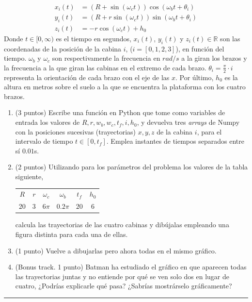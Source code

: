 \begin{enumerate}
	\begin{equation*}
		\begin{split}
			x_i(t) &= \left(R+\sin(\omega_c t)\right)\cos(\omega_b t+ \theta_i)\\
			y_i(t) &= \left(R+r\sin(\omega_c t)\right)\sin(\omega_b t+ \theta_i)\\
			z_i(t) &= -r\cos(\omega_c t) + h_0
		\end{split}
	\end{equation*}
	Donde $t \in [0,\infty)$ es el tiempo en segundos, $x_i(t)$, $y_i(t)$ y $z_i(t) \in \mathbb{R}$ son las coordenadas de la posición de la cabina $i$, ($i = [0,1,2,3]$), en función del tiempo. $\omega_b$ y $\omega_c$ son respectivamente la frecuencia en $rad/s$ a la giran los brazos y la frecuencia a la que giran las cabinas en el extremo de cada brazo. $\theta_i = \frac{\pi}{2}\cdot i$  representa la orientación de cada brazo con el eje de las $x$. Por último, $h_0$ es la altura en metros sobre el suelo a la que se encuentra la plataforma con los cuatro brazos.  
	
	\begin{enumerate}
		\item (3 puntos) Escribe una función en Python que tome como variables de entrada los valores de $R,r,w_b,w_c,t_f,i,h_0$, y devuelva tres \emph{arrays} de Numpy con la posiciones sucesivas (trayectorias) $x,y,z$ de la cabina $i$, para el intervalo de tiempo $t\in [0,t_f]$. Emplea instantes de tiempos separados entre sí $0.01$s.
		
		\item (2 puntos) Utilizando para los parámetros del problema los valores de la tabla siguiente,
		\begin{table}[h]
			\centering
			\begin{tabular}{c c c c c c}
				\hline
				$R$ & $r$ & $\omega_c$ & $\omega_b$ & $t_f$ & $h_0$\\
				$20$ & $3$ & $6\pi$ & $0.2\pi$ & $20$ & $6$\\
				\hline
			\end{tabular}
		\end{table}
		
		calcula las trayectorias de las cuatro cabinas y dibújalas empleando una figura distinta para cada una de ellas.
		\item (1 punto) Vuelve a dibujarlas pero ahora todas en el mismo gráfico.
		\item (Bonus track. 1 punto) Batman ha estudiado el gráfico en que aparecen todas las trayectorias juntas y no entiende por qué se ven solo dos en lugar de cuatro, ¿Podrías explicarle qué pasa?
		¿Sabrías mostrárselo gráficamente?
	\end{enumerate}
	
	
	
\end{enumerate}



\noindent\rule{\textwidth}{0.4pt}
